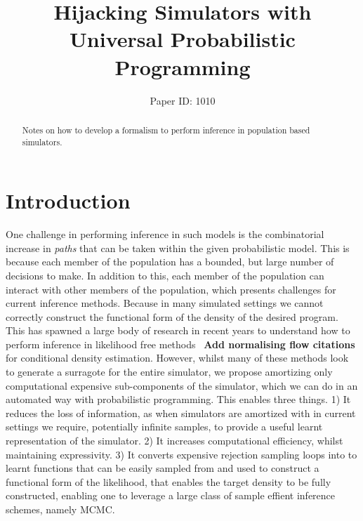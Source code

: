 \documentclass{article}
\title{Hijacking Simulators with Universal Probabilistic Programming}
\author{%
Paper ID: 1010 }
\begin{document}

\maketitle

\begin{abstract}

    Notes on how to develop a formalism to perform inference in population based simulators.
\end{abstract}

\section{Introduction}
\label{sec:intro}

One challenge in performing inference in such models is the combinatorial increase in \emph{paths}
that can be taken within the given probabilistic model.
This is because each member of the population has 
a bounded, but large number of decisions to make. 
In addition to this, each member of the population can interact
with other members of the population, which presents challenges for current inference methods.
Because in many simulated settings we cannot correctly construct the functional form of the density of the 
desired program. 
This has spawned a large body of research in recent years to understand how to perform 
inference in likelihood free methods~\cite{greenberg2019automatic} \textbf{Add normalising flow citations}
for conditional density estimation. However, whilst many of these methods look to generate a surragote 
for the entire simulator, we propose amortizing only computational expensive sub-components 
of the simulator, which we can do in an automated way with probabilistic programming. 
This enables three things. 
1) It reduces the loss of information, as when simulators are amortized with in current
settings we require, potentially infinite samples, to provide a useful learnt representation of the simulator. 
2) It increases computational efficiency, whilst maintaining expressivity. 
3) It converts expensive rejection sampling loops into to learnt functions that can be 
easily sampled from and used to construct a functional form of the likelihood, that enables the 
target density to be fully constructed, enabling one to leverage a large class of sample effient inference schemes, 
namely MCMC. 
\end{document}
